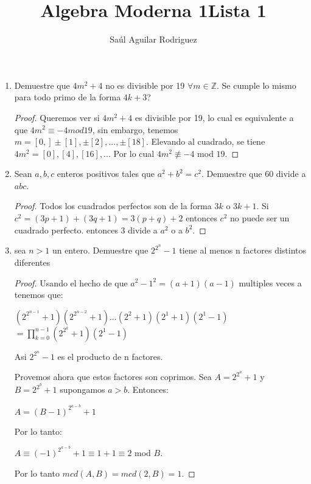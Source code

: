 \documentclass{article}
\title{Algebra Moderna 1}
\title{Lista 1}
\author{Sa\'ul Aguilar Rodriguez}
\theoremstyle{break}
\begin{document}
\maketitle
	\begin{enumerate}
		\item Demuestre que $4m^2+4$ no es divisible por 19 $\forall m \in \mathbb{Z}$. Se cumple lo mismo para todo primo de la forma $4k+3$?
		
		\begin{proof}
		Queremos ver si $4m^2+4$  es divisible por 19, lo cual es equivalente a que $4m^2\equiv -4 mod 19$, sin embargo, tenemos  $m=[0,]\pm [1],\pm [2], ..., \pm [18]$. Elevando al cuadrado, se tiene $4m^2=[0], [4], [16], ...$ Por lo cual $4m^2\not\equiv -4$ mod $19$.
		\end{proof}
		
		
		\item Sean $a,b,c$ enteros positivos tales que $a^2+b^2=c^2$. Demuestre que 60 divide a $abc$.
		
		\begin{proof}
		Todos los cuadrados perfectos son de la forma $3k$ o $3k+1$. Si $c^2=(3p+1)+(3q+1)=3(p+q)+2$ entonces $c^2$ no puede ser un cuadrado perfecto. entonces 3 divide a ${a^2}$ o a $b^2$. 
		
		\end{proof}
		
		\item sea $n>1$ un entero. Demuestre que $2^{2^n}-1$ tiene al menos n factores distintos diferentes
		
		\begin{proof}
		Usando el hecho de que $a^2-1^2=(a+1)(a-1)$ multiples veces a tenemos que:
		

		\begin{center}
		$(2^{2^{n-1}}+1)(2^{2^{n-2}}+1)...(2^2+1)(2^1+1)(2^1-1)$
		$=\displaystyle\prod_{k=0}^{n-1}(2^{2^k}+1)(2^1-1)$
		\end{center}
		Asi $2^{2^n}-1$ es el producto de n factores.
		
		Provemos ahora que estos factores son coprimos. Sea $A=2^{2^a}+1$ y $B=2^{2^b}+1$ supongamos $a>b$. Entonces:
		\begin{center}
			$A=(B-1)^{2^{a-b}}+1$
		\end{center}
		Por lo tanto:
		\begin{center}
			$A\equiv (-1)^{2^{a-b}}+1\equiv 1+1 \equiv 2$ mod $B$.
		\end{center}
		Por lo tanto $mcd(A,B)=mcd(2,B)=1$.
		

\end{proof}
\end{enumerate}
\end{document}
